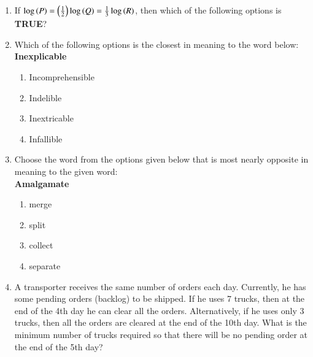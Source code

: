\documentclass[journal,12pt,onecolumn]{IEEEtran}
\theoremstyle{remark}
\begin{document}
\begin{enumerate}
\begin{enumerate}
\end{enumerate}
\item If $\log\left(P\right) = \left(\frac{1}{2}\right)\log\left(Q\right) = \frac{1}{3}\log\left(R\right)$, then which of the following options is \textbf{TRUE}?
\begin{enumerate}
\end{enumerate}
\item Which of the following options is the closest in meaning to the word below:\\
\textbf{Inexplicable}
\begin{enumerate}
\item Incomprehensible
\item Indelible
\item Inextricable
\item Infallible
\end{enumerate}
\item Choose the word from the options given below that is most nearly opposite in meaning to the given word:\\
\textbf{Amalgamate}
\begin{enumerate}
\item merge
\item split
\item collect
\item separate
\end{enumerate}
\item A transporter receives the same number of orders each day. Currently, he has some pending orders (backlog) to be shipped. If he uses 7 trucks, then at the end of the 4th day he can clear all the orders. Alternatively, if he uses only 3 trucks, then all the orders are cleared at the end of the 10th day. What is the minimum number of trucks required so that there will be no pending order at the end of the 5th day?

\end{enumerate}
\end{document}
